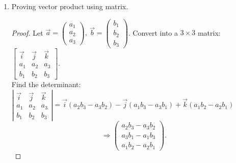 \documentclass[12pt, a4paper]{article}
\newtheorem{proof}{Proof}[subsection]
\begin{document}
\begin{enumerate}
\begin{itemize}
\begin{proof}
\begin{figure}[H]
      \end{figure}
      Since the base is not a parallelogram but a triangle, that is half an area of the parallelogram, we multiply $\frac{1}{2}$ in front of the expression of the cross product.
      $$\text{Base}=\frac{1}{2}\left|\vec{a}\times\vec{b}\right|.$$
      The volume of a pyramid is $\frac{1}{3}$ of the product of the base and the height. 
      $$\therefore V=\frac{1}{3}\text{Base}\cdot h=\frac{1}{3}\cdot\frac{1}{2}\left|\vec{a}\times\vec{b}\right|\left|\vec{c}\right|\left|\cos\theta\right|=\frac{1}{6}\left|\left(\vec{a}\times\vec{b}\right)\cdot\vec{c}\right|$$ 
    \end{proof}
  \end{itemize}
  \item Proving vector product using matrix. 
  \begin{proof}
    Let $\vec{a}=\begin{pmatrix}a_1\\a_2\\a_3\end{pmatrix},\ \vec{b}=\begin{pmatrix}b_1\\b_2\\b_3\end{pmatrix}$. Convert into a $3\times 3$ matrix: $\begin{bmatrix}\vec{i}&\vec{j}&\vec{k}\\a_1&a_2&a_3\\b_1&b_2&b_3\end{bmatrix}.$\\
    Find the determinant: $\left|\begin{matrix}\vec{i}&\vec{j}&\vec{k}\\a_1&a_2&a_3\\b_1&b_2&b_3\end{matrix}\right|=\vec{i}(a_2b_3-a_3b_2)-\vec{j}(a_1b_3-a_3b_1)+\vec{k}(a_1b_2-a_2b_1)$
    $$\Rightarrow \begin{pmatrix}a_2b_3-a_3b_2\\a_3b_1-a_1b_3\\a_1b_2-a_2b_1\end{pmatrix}.$$
  \end{proof}
\end{enumerate}
\end{document}
